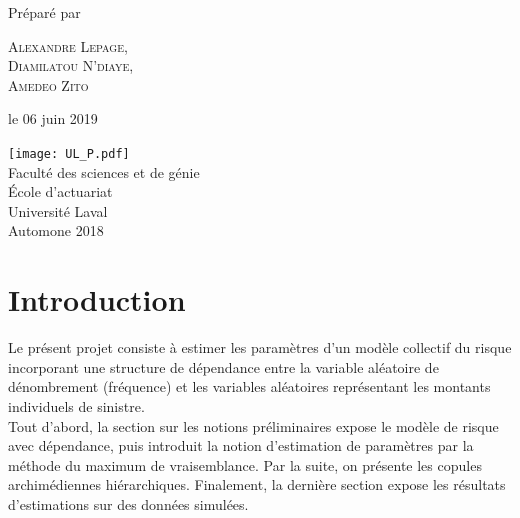 \documentclass{article}
\begin{document}
\begin{titlepage}
		Préparé par
		
		\vspace{0.5\baselineskip} %
		
		{\scshape\Large Alexandre Lepage, \\
			Diamilatou N'diaye, \\ Amedeo Zito \\} %
		
		\vspace*{5\baselineskip}
		
		le 06 juin 2019
		
		\vspace{0.5\baselineskip} %
		
		\vfill %
		
		
		\texttt{[image: UL\_P.pdf]}\\
		
		Faculté des sciences et de génie\\
		École d'actuariat\\
		Université Laval\\
		Automone 2018       
		
	\end{titlepage}
	
	\setcounter{page}{0}
	
	\newpage
	\strut %
	\newpage
	
	\tableofcontents
	\newpage
	\renewcommand{\listfigurename}{Liste des illustrations}
	\listoffigures
	\newpage
	\listoftables
	\newpage
	
	\setcounter{page}{1}
	
	\section{Introduction}
	Le présent projet consiste à estimer les paramètres d'un modèle collectif du risque incorporant une structure de dépendance entre la variable aléatoire de dénombrement (fréquence) et les variables aléatoires représentant les montants individuels de sinistre.\\
	
	Tout d'abord, la section sur les notions préliminaires expose le modèle de risque avec dépendance, puis introduit la notion d'estimation de paramètres par la méthode du maximum de vraisemblance. Par la suite, on présente les copules archimédiennes hiérarchiques.
	Finalement, la dernière section expose les résultats d'estimations sur des données simulées.
	
\end{document}
